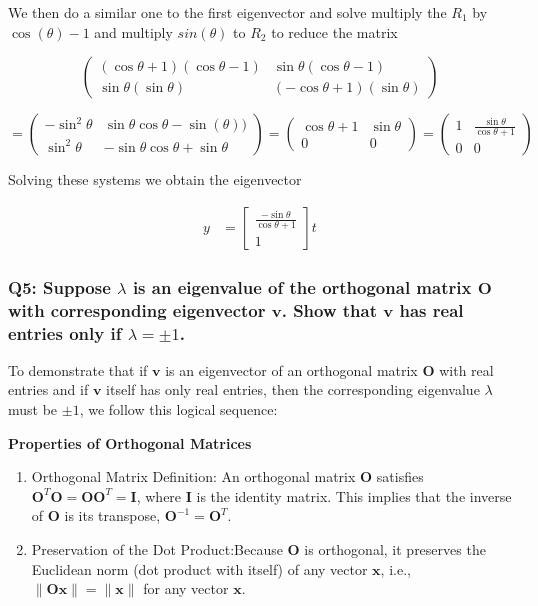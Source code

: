 \documentclass[8pt]{article}
\begin{document}
{We then do a similar one to the first eigenvector and solve multiply the $R_1$ by $\cos(\theta) -1$ and multiply $sin(\theta)$ to $R_2$ to reduce the matrix

$$
\begin{pmatrix}
(\cos \theta + 1)(\cos \theta -1) & \sin \theta (\cos \theta - 1)\\
\sin \theta (\sin \theta) & (-\cos \theta +1)(\sin \theta)
\end{pmatrix} 
$$

$$
= \begin{pmatrix}
-\sin^2 \theta & \sin \theta \cos \theta - \sin(\theta))\\
\sin^2 \theta & -\sin \theta\cos \theta +\sin \theta
\end{pmatrix} =
\begin{pmatrix}
\cos \theta +1 & \sin \theta \\
0 & 0
\end{pmatrix} =
\begin{pmatrix}
1 & \frac{\sin \theta}{\cos \theta +1} \\
0 & 0
\end{pmatrix}
$$


Solving these systems we obtain the eigenvector 

\begin{align}
    y &= \begin{bmatrix}
           \frac{-\sin \theta }{\cos \theta +1} \\
           1
         \end{bmatrix}t 
\end{align}

\subsubsection*{Q5: Suppose \(\lambda\) is an eigenvalue of the orthogonal matrix \(\mathbf{O}\) with corresponding eigenvector \(\mathbf{v}\). Show that \(\mathbf{v}\) has real entries only if \(\lambda = \pm 1\).}

To demonstrate that if \(\mathbf{v}\) is an eigenvector of an orthogonal matrix \(\mathbf{O}\) with real entries and if \(\mathbf{v}\) itself has only real entries, then the corresponding eigenvalue \(\lambda\) must be \(\pm 1\), we follow this logical sequence:

\textbf{Properties of Orthogonal Matrices}

\begin{enumerate}
    \item Orthogonal Matrix Definition: An orthogonal matrix \(\mathbf{O}\) satisfies \(\mathbf{O}^T \mathbf{O} = \mathbf{O} \mathbf{O}^T = \mathbf{I}\), where \(\mathbf{I}\) is the identity matrix. This implies that the inverse of \(\mathbf{O}\) is its transpose, \(\mathbf{O}^{-1} = \mathbf{O}^T\).
    \item Preservation of the Dot Product:Because \(\mathbf{O}\) is orthogonal, it preserves the Euclidean norm (dot product with itself) of any vector \(\mathbf{x}\), i.e., \(\|\mathbf{Ox}\| = \|\mathbf{x}\|\) for any vector \(\mathbf{x}\).
\end{enumerate}

}
\end{document}
